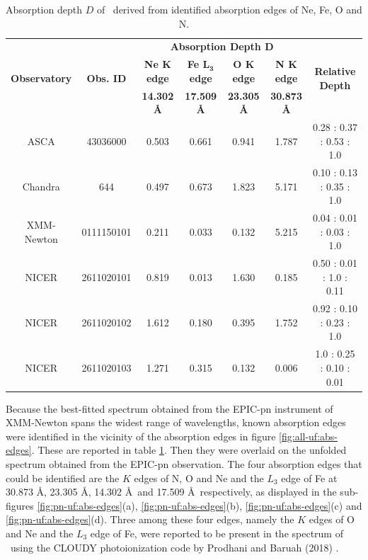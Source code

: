     \begin{table}[!htb]
    	\centering
    	\caption{Absorption depth $D$ of \source\ derived from identified absorption edges of Ne, Fe, O and N.}
    	\label{tab:abs-depth}
		\begin{tabular}{ccccccc}
			\hline
			\multirow{3}{*}{\textbf{Observatory}} & \multirow{3}{*}{\textbf{Obs. ID}} & \multicolumn{4}{c}{\textbf{Absorption Depth $\boldsymbol{D}$}} & \multirow{3}{*}{\textbf{Relative Depth}} \\ \cline{3-6} & & \textbf{Ne $\boldsymbol{K}$ edge} & \textbf{Fe $\boldsymbol{L_3}$ edge} & \textbf{O $\boldsymbol{K}$ edge} & \textbf{N $\boldsymbol{K}$ edge} \\ \cline{3-6} & & \textbf{14.302 \AA} & \textbf{17.509 \AA} & \textbf{23.305 \AA} & \textbf{30.873 \AA} \\
			\hline
			{ASCA} & {43036000} & {0.503} & {0.661} & {0.941} & {1.787} & {0.28 : 0.37 : 0.53 : 1.0} \\ %
			{Chandra} & {644} & {0.497} & {0.673} & {1.823} & {5.171} & {0.10 : 0.13 : 0.35 : 1.0} \\ %
			{XMM-Newton} & {0111150101} & {0.211} & {0.033} & {0.132} & {5.215} & {0.04 : 0.01 : 0.03 : 1.0} \\ %
			{NICER} & {2611020101} & {0.819} & {0.013} & {1.630} & {0.185} & {0.50 : 0.01 : 1.0 : 0.11} \\ %
			{NICER} & {2611020102} & {1.612} & {0.180} & {0.395} & {1.752} & {0.92 : 0.10 : 0.23 : 1.0} \\ %
			{NICER} & {2611020103} & {1.271} & {0.315} & {0.132} & {0.006} & {1.0 : 0.25 : 0.10 : 0.01} \\ %
			\hline
		\end{tabular}
	\end{table}

    Because the best-fitted spectrum obtained from the EPIC-pn instrument of XMM-Newton spans the widest range of wavelengths, known absorption edges \cite{bearden1967reevaluation,juett2006high} were identified in the vicinity of the absorption edges in figure \ref{fig:all-uf:abs-edges}. These are reported in table \ref{tab:abs-depth}. Then they were overlaid on the unfolded spectrum obtained from the EPIC-pn observation. The four absorption edges that could be identified are the $K$ edges of N, O and Ne and the $L_3$ edge of Fe at 30.873 \AA, 23.305 \AA, 14.302 \AA\ and 17.509 \AA\ respectively, as displayed in the sub-figures \ref{fig:pn-uf:abs-edges}(a), \ref{fig:pn-uf:abs-edges}(b), \ref{fig:pn-uf:abs-edges}(c) and \ref{fig:pn-uf:abs-edges}(d). Three among these four edges, namely the $K$ edges of O and Ne and the $L_3$ edge of Fe, were reported to be present in the spectrum of \source\ using the CLOUDY photoionization code by Prodhani and Baruah (2018) \cite{prodhani2018galactic}.
    

